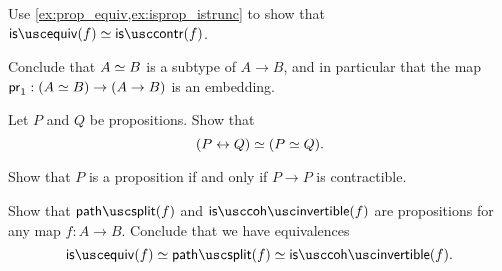 \begin{exercises}
\begin{subexenum}
\item Use \cref{ex:prop_equiv,ex:isprop_istrunc} to show that $\isequiv(f)\eqvsym \iscontr(f)$.
\end{subexenum}
Conclude that $\eqv{A}{B}$ is a subtype of $A\to B$, and in particular that the map $\proj 1 : (\eqv{A}{B})\to (A\to B)$ is an embedding.
\item \label{ex:prop_equiv}
\begin{subexenum}
\item \label{ex:equiv-bi-implication}Let $P$ and $Q$ be propositions. Show that
\begin{equation*}
\eqv{(P\leftrightarrow Q)}{(\eqv{P}{Q})}.
\end{equation*}
\item Show that $P$ is a proposition if and only if $P\to P$ is contractible.
\end{subexenum}
\item Show that $\pathsplit(f)$ and $\iscohinvertible(f)$ are propositions for any map $f:A\to B$. Conclude that we have equivalences
  \begin{equation*}
    \isequiv(f) \eqvsym \pathsplit(f) \eqvsym \iscohinvertible(f).
  \end{equation*}

\end{exercises}
